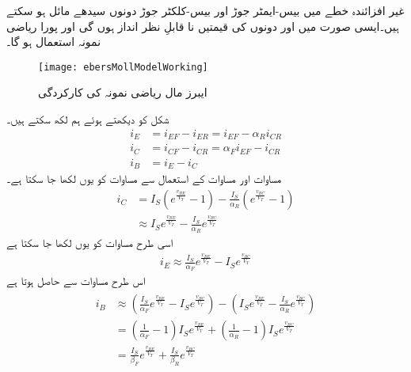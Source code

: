 	غیر افزائندہ خطے میں بیس-ایمٹر  جوڑ اور بیس-کلکٹر جوڑ دونوں سیدھے مائل ہو سکتے ہیں۔ایسی صورت میں  اور  دونوں کی قیمتیں نا قابلِ نظر انداز ہوں گی اور پورا ریاضی نمونہ  استعمال ہو گا۔
\begin{figure}
\centering
\texttt{[image: ebersMollModelWorking]}
\caption{ ایبرز مال ریاضی نمونہ  کی کارکردگی}
\label{شکل_ایبر_مال_کی_کارکردگی}
\end{figure}
شکل   کو دیکھتے  ہوئے ہم لکھ سکتے ہیں۔
\begin{align}
i_E&=i_{EF}-i_{ER}=i_{EF}-\alpha_R i_{CR} \label{مساوات_ٹرانزسٹر_مکمل_ایبر_مال_مخارج_رو}  \\
i_C&=i_{CF}-i_{CR}=\alpha_F i_{EF}-i_{CR} \label{مساوات_ٹرانزسٹر_مکمل_ایبر_مال_کلکٹر _رو} \\
i_B&=i_E-i_C \label{مساوات_ٹرانزسٹر_مکمل_ایبر_مال_قابو_رو_الف}
\end{align}
مساوات   اور مساوات   کے استعمال سے مساوات   کو یوں لکھا جا سکتا ہے۔
\begin{align} \label{مساوات_ٹرانزسٹر_مکمل_ایبر_مال_کلکٹر _رو_بہتر}
i_C&=I_S \left (e^{\frac{v_{BE}}{V_T}}-1 \right )-\frac{I_S}{\alpha_R} \left (e^{\frac{v_{BC}}{V_T}}-1 \right )\\
&\approx I_S e^{\frac{v_{BE}}{V_T}}-\frac{I_S}{\alpha_R} e^{\frac{v_{BC}}{V_T}}
\end{align}
اسی طرح مساوات   کو یوں لکھا جا سکتا ہے
\begin{align} \label{مساوات_ٹرانزسٹر_مکمل_ایبر_مال_مخارج_رو_بہتر}
i_E \approx \frac{I_S}{\alpha_F} e^{\frac{v_{BE}}{V_T}}-I_S e^{\frac{v_{BC}}{V_T}}
\end{align}
اس طرح مساوات   سے حاصل ہوتا ہے
\begin{gather} \label{مساوات_ٹرانزسٹر_مکمل_ایبر_مال_قابو_رو_بہتر}
\begin{aligned}
i_B &\approx  \left (\frac{I_S}{\alpha_F} e^{\frac{v_{BE}}{V_T}}-I_S e^{\frac{v_{BC}}{V_T}} \right )- \left (I_S e^{\frac{v_{BE}}{V_T}}-\frac{I_S}{\alpha_R} e^{\frac{v_{BC}}{V_T}} \right )\\
&=\left (\frac{1}{\alpha_F}-1 \right ) I_S e^{\frac{v_{BE}}{V_T}}+\left (\frac{1}{\alpha_R}-1 \right ) I_S e^{\frac{v_{BC}}{V_T}}\\
&=\frac{I_S}{\beta_F} e^{\frac{v_{BE}}{V_T}}+\frac{I_S}{\beta_R} e^{\frac{v_{BC}}{V_T}}
\end{aligned}
\end{gather}
